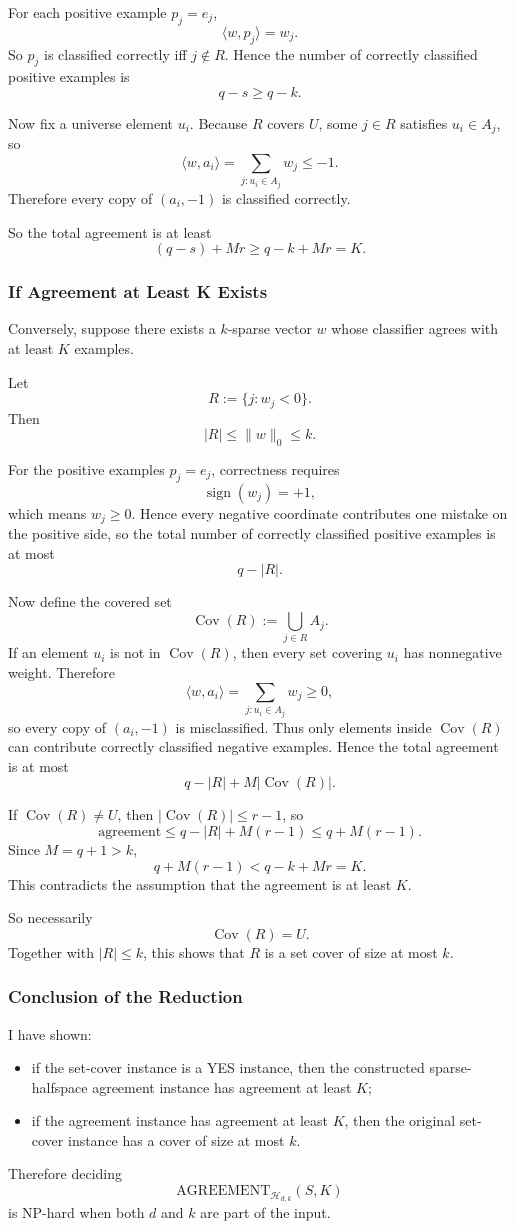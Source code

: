 \documentclass{article}
\DeclareMathOperator{\sign}{sign}
\DeclareMathOperator{\Cov}{Cov}
\newcommand{\cH}{\mathcal{H}}
\begin{document}
For each positive example $p_j=e_j$,
$$
\langle w,p_j\rangle = w_j.
$$
So $p_j$ is classified correctly iff $j\notin R$. Hence the number of correctly classified positive examples is
$$
q-s \ge q-k.
$$

Now fix a universe element $u_i$. Because $R$ covers $U$, some $j\in R$ satisfies $u_i\in A_j$, so
$$
\langle w,a_i\rangle
=
\sum_{j:u_i\in A_j} w_j
\le -1.
$$
Therefore every copy of $(a_i,-1)$ is classified correctly.

So the total agreement is at least
$$
(q-s)+Mr \ge q-k+Mr = K.
$$

\subsubsection{If Agreement at Least K Exists}

Conversely, suppose there exists a $k$-sparse vector $w$ whose classifier agrees with at least $K$ examples.

Let
$$
R := \{j : w_j < 0\}.
$$
Then
$$
|R| \le \|w\|_0 \le k.
$$

For the positive examples $p_j=e_j$, correctness requires
$$
\sign(w_j)=+1,
$$
which means $w_j\ge 0$. Hence every negative coordinate contributes one mistake on the positive side, so the total number of correctly classified positive examples is at most
$$
q-|R|.
$$

Now define the covered set
$$
\Cov(R) := \bigcup_{j\in R} A_j.
$$
If an element $u_i$ is not in $\Cov(R)$, then every set covering $u_i$ has nonnegative weight. Therefore
$$
\langle w,a_i\rangle
=
\sum_{j:u_i\in A_j} w_j
\ge 0,
$$
so every copy of $(a_i,-1)$ is misclassified. Thus only elements inside $\Cov(R)$ can contribute correctly classified negative examples. Hence the total agreement is at most
$$
q-|R| + M|\Cov(R)|.
$$

If $\Cov(R)\neq U$, then $|\Cov(R)|\le r-1$, so
$$
\text{agreement}
\le
q-|R|+M(r-1)
\le
q+M(r-1).
$$
Since $M=q+1>k$,
$$
q+M(r-1)
<
q-k+Mr
=
K.
$$
This contradicts the assumption that the agreement is at least $K$.

So necessarily
$$
\Cov(R)=U.
$$
Together with $|R|\le k$, this shows that $R$ is a set cover of size at most $k$.

\subsubsection{Conclusion of the Reduction}

I have shown:
\begin{itemize}
\item if the set-cover instance is a YES instance, then the constructed sparse-halfspace agreement instance has agreement at least $K$;
\item if the agreement instance has agreement at least $K$, then the original set-cover instance has a cover of size at most $k$.
\end{itemize}
Therefore deciding
$$
\mathrm{AGREEMENT}_{\cH_{d,k}}(S,K)
$$
is NP-hard when both $d$ and $k$ are part of the input.
\end{document}
